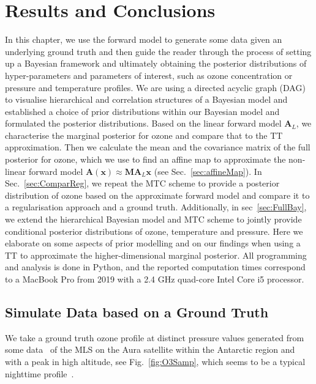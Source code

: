 \chapter{Results and Conclusions}
\label{ch:res}
In this chapter, we use the forward model to generate some data given an underlying ground truth and then guide the reader through the process of setting up a Bayesian framework and ultimately obtaining the posterior distributions of hyper-parameters and parameters of interest, such as ozone concentration or pressure and temperature profiles.
We are using a directed acyclic graph (DAG) to visualise hierarchical and correlation structures of a Bayesian model and established a choice of prior distributions within our Bayesian model and formulated the posterior distributions.
Based on the linear forward model $\bm{A}_L$, we characterise the marginal posterior for ozone and compare that to the TT approximation.
Then we calculate the mean and the covariance matrix of the full posterior for ozone, which we use to find an affine map to approximate the non-linear forward model $\bm{A}(\bm{x}) \approx \bm{M} \bm{A}_{L} \bm{x}$ (see Sec.~\ref{sec:affineMap}).
In Sec.~\ref{sec:ComparReg}, we repeat the MTC scheme to provide a posterior distribution of ozone based on the approximate forward model and compare it to a regularisation approach and a ground truth.
Additionally, in sec~\ref{sec:FullBay}, we extend the hierarchical Bayesian model and MTC scheme to jointly provide conditional posterior distributions of ozone, temperature and pressure.
Here we elaborate on some aspects of prior modelling and on our findings when using a TT to approximate the higher-dimensional marginal posterior.
All programming and analysis is done in Python, and the reported computation times correspond to a MacBook Pro from 2019 with a 2.4 GHz quad-core Intel Core i5 processor.
\clearpage

\section{Simulate Data based on a Ground Truth}
We take a ground truth ozone profile at distinct pressure values generated from some data~\cite{MLSdata} of the MLS on the Aura satellite within the Antarctic region and with a peak in high altitude, see Fig.~\ref{fig:O3Samp}, which seems to be a typical nighttime profile~\cite{Lee2020NightOzone}.

